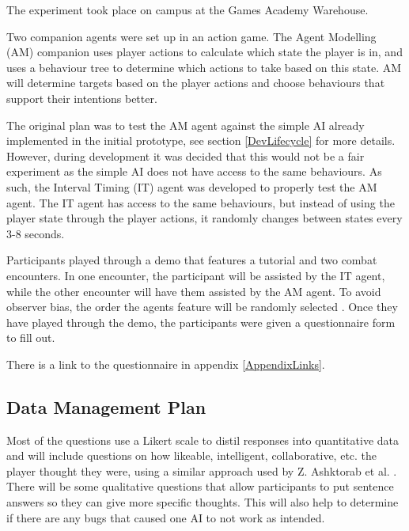 \documentclass{IEEEtran}
\begin{document}


The experiment took place on campus at the Games Academy Warehouse.

Two companion agents were set up in an action game. The Agent Modelling (AM) companion uses player actions to calculate which state the player is in, and uses a behaviour tree to determine which actions to take based on this state. AM will determine targets based on the player actions and choose behaviours that support their intentions better.

The original plan was to test the AM agent against the simple AI already implemented in the initial prototype, see section \ref{DevLifecycle} for more details. However, during development it was decided that this would not be a fair experiment as the simple AI does not have access to the same behaviours. As such, the Interval Timing (IT) agent was developed to properly test the AM agent. The IT agent has access to the same behaviours, but instead of using the player state through the player actions, it randomly changes between states every 3-8 seconds.

Participants played through a demo that features a tutorial and two combat encounters. In one encounter, the participant will be assisted by the IT agent, while the other encounter will have them assisted by the AM agent. To avoid observer bias, the order the agents feature will be randomly selected \cite{hrobjartsson2013observer}. Once they have played through the demo, the participants were given a questionnaire form to fill out.

There is a link to the questionnaire in appendix \ref{AppendixLinks}.

\subsection{Data Management Plan}
\label{DataManagement}


Most of the questions use a Likert scale to distil responses into quantitative data and will include questions on how likeable, intelligent, collaborative, etc. the player thought they were, using a similar approach used by Z. Ashktorab et al. \cite{SocialPerceptions2020}. There will be some qualitative questions that allow participants to put sentence answers so they can give more specific thoughts. This will also help to determine if there are any bugs that caused one AI to not work as intended.
\end{document}
